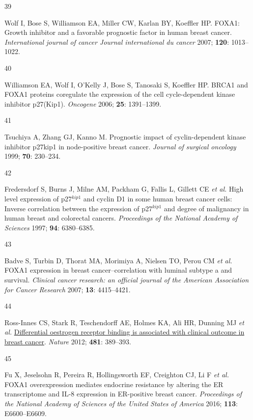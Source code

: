 \documentclass[
  12pt,
]{article}
\newlength{\cslhangindent}
\newlength{\csllabelwidth}
\newlength{\cslentryspacingunit} %
\newenvironment{CSLReferences}[2] %
 {%
  \setlength{\parindent}{0pt}
  \ifodd #1
  \let\oldpar\par
  \def\par{\hangindent=\cslhangindent\oldpar}
  \fi
  \setlength{\parskip}{#2\cslentryspacingunit}
 }%
 {}
\newcommand{\CSLLeftMargin}[1]{\parbox[t]{\csllabelwidth}{#1}}
\newcommand{\CSLRightInline}[1]{\parbox[t]{\linewidth - \csllabelwidth}{#1}\break}
\begin{document}
\begin{CSLReferences}{0}{0}
\leavevmode{}%
\CSLLeftMargin{39 }%
\CSLRightInline{Wolf I, Bose S, Williamson EA, Miller CW, Karlan BY, Koeffler HP. {FOXA1}: Growth inhibitor and a favorable prognostic factor in human breast cancer. \emph{International journal of cancer Journal international du cancer} 2007; \textbf{120}: 1013--1022.}

\leavevmode{}%
\CSLLeftMargin{40 }%
\CSLRightInline{Williamson EA, Wolf I, O'Kelly J, Bose S, Tanosaki S, Koeffler HP. {BRCA1} and {FOXA1} proteins coregulate the expression of the cell cycle-dependent kinase inhibitor p27(Kip1). \emph{Oncogene} 2006; \textbf{25}: 1391--1399.}

\leavevmode{}%
\CSLLeftMargin{41 }%
\CSLRightInline{Tsuchiya A, Zhang GJ, Kanno M. Prognostic impact of cyclin-dependent kinase inhibitor p27kip1 in node-positive breast cancer. \emph{Journal of surgical oncology} 1999; \textbf{70}: 230--234.}

\leavevmode{}%
\CSLLeftMargin{42 }%
\CSLRightInline{Fredersdorf S, Burns J, Milne AM, Packham G, Fallis L, Gillett CE \emph{et al.} High level expression of p27\(^{kip1}\) and cyclin {D1} in some human breast cancer cells: Inverse correlation between the expression of p27\(^{kip1}\) and degree of malignancy in human breast and colorectal cancers. \emph{Proceedings of the National Academy of Sciences} 1997; \textbf{94}: 6380--6385.}

\leavevmode{}%
\CSLLeftMargin{43 }%
\CSLRightInline{Badve S, Turbin D, Thorat MA, Morimiya A, Nielsen TO, Perou CM \emph{et al.} {FOXA1} expression in breast cancer--correlation with luminal subtype a and survival. \emph{Clinical cancer research: an official journal of the American Association for Cancer Research} 2007; \textbf{13}: 4415--4421.}

\leavevmode{}%
\CSLLeftMargin{44 }%
\CSLRightInline{Ross-Innes CS, Stark R, Teschendorff AE, Holmes KA, Ali HR, Dunning MJ \emph{et al.} \href{https://doi.org/10.1038/nature10730}{Differential oestrogen receptor binding is associated with clinical outcome in breast cancer}. \emph{Nature} 2012; \textbf{481}: 389--393.}

\leavevmode{}%
\CSLLeftMargin{45 }%
\CSLRightInline{Fu X, Jeselsohn R, Pereira R, Hollingsworth EF, Creighton CJ, Li F \emph{et al.} {FOXA1} overexpression mediates endocrine resistance by altering the {ER} transcriptome and {IL-8} expression in {ER-positive} breast cancer. \emph{Proceedings of the National Academy of Sciences of the United States of America} 2016; \textbf{113}: E6600--E6609.}


\end{CSLReferences}
\end{document}
